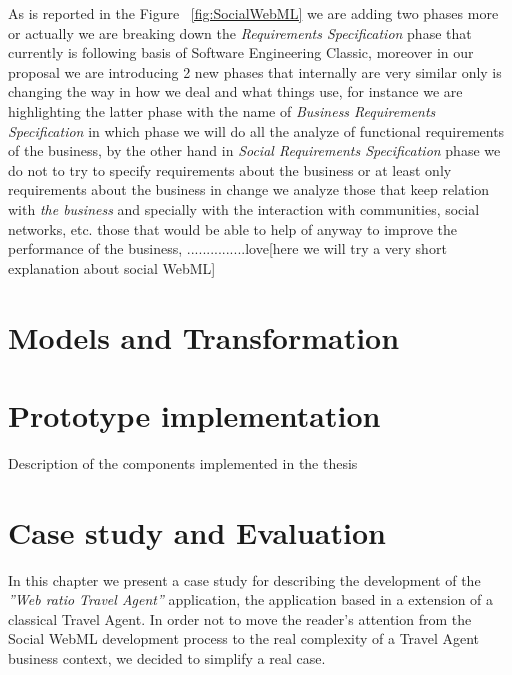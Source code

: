 \documentclass[a4paper]{memoir}
\begin{document}
	As is reported in the Figure ~\ref{fig:SocialWebML} we are adding two phases more or actually we are breaking down the \textit{Requirements Specification} phase that currently is following basis of Software Engineering Classic, moreover in our proposal we are introducing 2 new phases that internally are very similar only is changing  the way in how we deal and what things use, for instance we are highlighting the latter phase with the name of \textit{Business Requirements Specification} in which phase we will do all the analyze of functional requirements of the business, by the other hand in \textit{Social Requirements Specification} phase we do not to try to specify requirements about the business or at least only requirements about the business in change we analyze those that keep relation with \textit{the business} and specially with the interaction with communities, social networks, etc. those that would be able to help of anyway to improve the performance of the business, ...............\textcolor{rosa}{love[here we will try a very short explanation about social WebML]}
 
\chapter{Models and Transformation} %
\label{chap:Models and Transformation}

\chapter{Prototype implementation} %
\label{chap:Prototype implementation}
Description of the components implemented in the thesis

\chapter{Case study and Evaluation} %
\label{chap:Case study and Evaluation}




In this chapter we present a case study for describing the development of the \textit{''Web ratio Travel Agent''} application, the application based in a extension of a classical Travel Agent.
In order not to move the reader's attention from the Social \ac{WebML} development process to the real complexity of a Travel Agent business context, we decided to simplify a real case.
	
\end{document}

